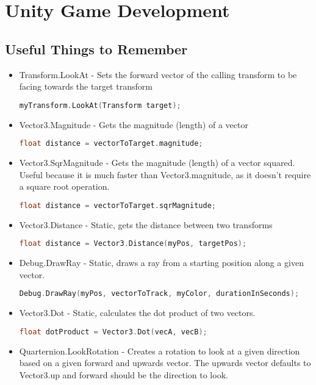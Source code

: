 \documentclass{article}
\begin{document}
\newpage
\section{Unity Game Development}
\subsection{Useful Things to Remember}
\begin{itemize}
    \item Transform.LookAt - Sets the forward vector of the calling transform to be facing towards the target transform
    \begin{lstlisting}[language=C++]
                myTransform.LookAt(Transform target); \end{lstlisting} 
    \item Vector3.Magnitude - Gets the magnitude (length) of a vector
    \begin{lstlisting}[language=C++]
                float distance = vectorToTarget.magnitude; \end{lstlisting}
    \item Vector3.SqrMagnitude - Gets the magnitude (length) of a vector squared. Useful because it is much faster than Vector3.magnitude, as it doesn't require a square root operation.
    \begin{lstlisting}[language=C++]
                float distance = vectorToTarget.sqrMagnitude; \end{lstlisting}
    \item Vector3.Distance - Static, gets the distance between two transforms
    \begin{lstlisting}[language=C++]
                float distance = Vector3.Distance(myPos, targetPos); \end{lstlisting}
    \item Debug.DrawRay - Static, draws a ray from a starting position along a given vector.
    \begin{lstlisting}[language=C++]
                Debug.DrawRay(myPos, vectorToTrack, myColor, durationInSeconds); \end{lstlisting}
    \item Vector3.Dot - Static, calculates the dot product of two vectors.
    \begin{lstlisting}[language=C++]
                float dotProduct = Vector3.Dot(vecA, vecB); \end{lstlisting}
    \item Quarternion.LookRotation - Creates a rotation to look at a given direction based on a given forward and upwards vector. The upwards vector defaults to Vector3.up and forward should be the direction to look.

\end{itemize}
\end{document}
